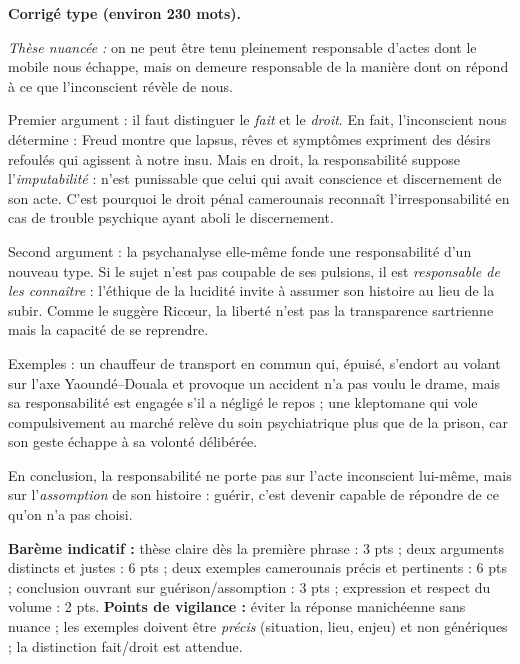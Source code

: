 \documentclass[11pt]{article}
\begin{document}
\begin{corrige}
\textbf{Corrigé type (environ 230 mots).}

\emph{Thèse nuancée :} on ne peut être tenu pleinement responsable d'actes dont le mobile nous échappe, mais on demeure responsable de la manière dont on répond à ce que l'inconscient révèle de nous.

Premier argument : il faut distinguer le \emph{fait} et le \emph{droit}. En fait, l'inconscient nous détermine : Freud montre que lapsus, rêves et symptômes expriment des désirs refoulés qui agissent à notre insu. Mais en droit, la responsabilité suppose l'\emph{imputabilité} : n'est punissable que celui qui avait conscience et discernement de son acte. C'est pourquoi le droit pénal camerounais reconnaît l'irresponsabilité en cas de trouble psychique ayant aboli le discernement.

Second argument : la psychanalyse elle-même fonde une responsabilité d'un nouveau type. Si le sujet n'est pas coupable de ses pulsions, il est \emph{responsable de les connaître} : l'éthique de la lucidité invite à assumer son histoire au lieu de la subir. Comme le suggère Ricœur, la liberté n'est pas la transparence sartrienne mais la capacité de se reprendre.

Exemples : un chauffeur de transport en commun qui, épuisé, s'endort au volant sur l'axe Yaoundé--Douala et provoque un accident n'a pas voulu le drame, mais sa responsabilité est engagée s'il a négligé le repos ; une kleptomane qui vole compulsivement au marché relève du soin psychiatrique plus que de la prison, car son geste échappe à sa volonté délibérée.

En conclusion, la responsabilité ne porte pas sur l'acte inconscient lui-même, mais sur l'\emph{assomption} de son histoire : guérir, c'est devenir capable de répondre de ce qu'on n'a pas choisi.

\textbf{Barème indicatif :} thèse claire dès la première phrase : 3 pts ; deux arguments distincts et justes : 6 pts ; deux exemples camerounais précis et pertinents : 6 pts ; conclusion ouvrant sur guérison/assomption : 3 pts ; expression et respect du volume : 2 pts.
\textbf{Points de vigilance :} éviter la réponse manichéenne sans nuance ; les exemples doivent être \emph{précis} (situation, lieu, enjeu) et non génériques ; la distinction fait/droit est attendue.
\end{corrige}

\newpage
\end{document}
